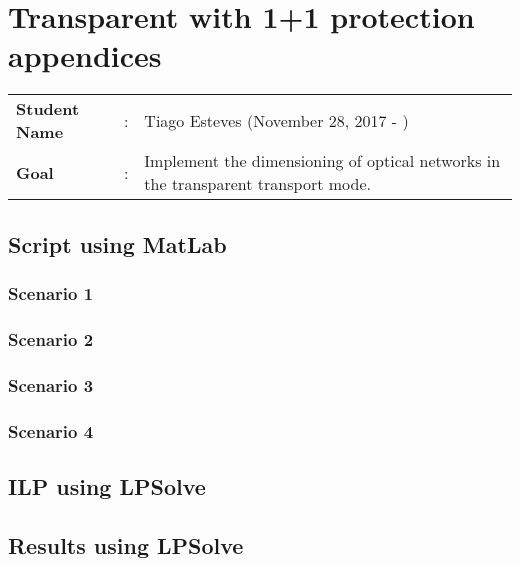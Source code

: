 \clearpage

\section{Transparent with 1+1 protection appendices}
\begin{tcolorbox}	
\begin{tabular}{p{2.75cm} p{0.2cm} p{10.5cm}} 	
\textbf{Student Name}  &:& Tiago Esteves    (November 28, 2017 - )\\
\textbf{Goal}          &:& Implement the dimensioning of optical networks in the transparent transport mode.
\end{tabular}
\end{tcolorbox}


\subsection{Script using MatLab}

\subsubsection{Scenario 1}

\subsubsection{Scenario 2}

\subsubsection{Scenario 3}

\subsubsection{Scenario 4}


\subsection{ILP using LPSolve}

\subsection{Results using LPSolve}
